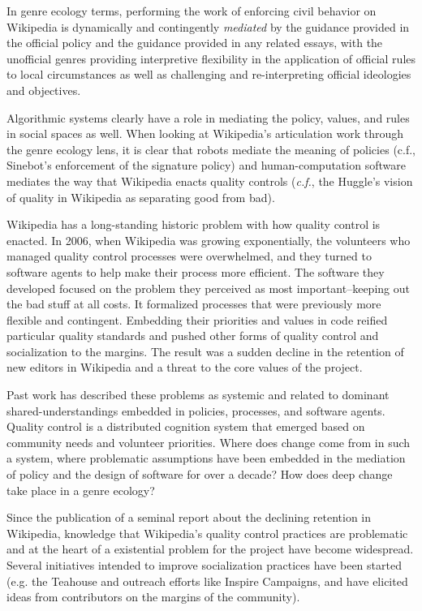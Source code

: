In genre ecology terms, performing the work of enforcing civil behavior on Wikipedia is dynamically and contingently \emph{mediated} by the guidance provided in the official policy and the guidance provided in any related essays, with the unofficial genres providing interpretive flexibility in the application of official rules to local circumstances as well as challenging and re-interpreting official ideologies and objectives.

Algorithmic systems clearly have a role in mediating the policy, values, and rules in social spaces as well\cite{lessig1999code}.  When looking at Wikipedia's articulation work through the genre ecology lens, it is clear that robots mediate the meaning of policies (c.f., Sinebot's enforcement of the signature policy\cite{geiger2011lives}) and human-computation software mediates the way that Wikipedia enacts quality controls (\emph{c.f.}, the Huggle's vision of quality in Wikipedia as separating good from bad\cite{halfaker2014snuggle}).

  Wikipedia has a long-standing historic problem with how quality control is enacted.  In 2006, when Wikipedia was growing exponentially, the volunteers who managed quality control processes were overwhelmed, and they turned to software agents to help make their process more efficient\cite{halfaker2014snuggle}.  The software they developed focused on the problem they perceived as most important--keeping out the bad stuff at all costs. It formalized processes that were previously more flexible and contingent. Embedding their priorities and values in code reified particular quality standards and pushed other forms of quality control and socialization to the margins\cite{halfaker2013rise}.  The result was a sudden decline in the retention of new editors in Wikipedia and a threat to the core values of the project.

Past work has described these problems as systemic and related to dominant shared-understandings embedded in policies, processes, and software agents\cite{halfaker2014snuggle}.  Quality control is a distributed cognition system that emerged based on community needs and volunteer priorities\cite{geiger2010work}.  Where does change come from in such a system, where problematic assumptions have been embedded in the mediation of policy and the design of software for over a decade?  How does deep change take place in a genre ecology?

Since the publication of a seminal report about the declining retention in Wikipedia, knowledge that Wikipedia's quality control practices are problematic and at the heart of a existential problem for the project have become widespread.  Several initiatives intended to improve socialization practices have been started (e.g. the Teahouse and outreach efforts like Inspire Campaigns\cite{morgan2015what}, and have elicited ideas from contributors on the margins of the community).

